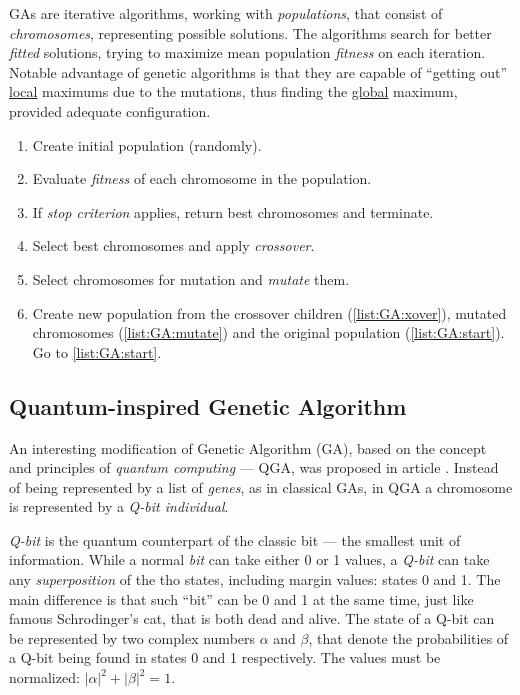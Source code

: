 \documentclass[ThesisDoc]{subfiles}
\begin{document}
GAs are iterative algorithms, working with \emph{populations}, that consist of
\emph{chromosomes}, representing possible solutions. The algorithms search
for better \emph{fitted} solutions, trying to maximize mean population
\emph{fitness} on each iteration.
Notable advantage of genetic algorithms is that they are capable of
``getting out'' \underline{local} maximums due to the mutations, thus finding
the \underline{global} maximum, provided adequate configuration.

\begin{enumerate}[start=0]
  \item Create initial population (randomly).
  \item\label{list:GA:start} Evaluate \emph{fitness} of each chromosome in the population.
  \item If \emph{stop criterion} applies, return best chromosomes and terminate.
  \item\label{list:GA:xover} Select best chromosomes and apply \emph{crossover}.
  \item\label{list:GA:mutate} Select chromosomes for mutation and \emph{mutate} them.
  \item Create new population from the crossover children (\ref{list:GA:xover}),
        mutated chromosomes (\ref{list:GA:mutate}) and the original population
        (\ref{list:GA:start}).
        Go to \ref{list:GA:start}.
\end{enumerate}

\subsection{Quantum-inspired Genetic Algorithm}
An interesting modification of Genetic Algorithm (GA), based on the concept and
principles of \emph{quantum computing} --- QGA, was proposed in article
\cite{QuantumGeneticAlgorithm}.
Instead of being represented by a list of \emph{genes}, as in classical GAs,
in QGA a chromosome is represented by a \emph{Q-bit individual}.

\emph{Q-bit} is the quantum counterpart of the classic bit --- the smallest
unit of information. While a normal \emph{bit} can take either 0 or 1 values,
a \emph{Q-bit} can take any \emph{superposition} of the tho states, including
margin values: states 0 and 1. The main difference is that such ``bit'' can be
0 and 1 at the same time, just like famous Schrodinger's cat, that is both dead
and alive. The state of a Q-bit can be represented by two complex numbers
$\alpha$ and $\beta$, that denote the probabilities of a Q-bit being found in
states 0 and 1 respectively.
The values must be normalized: $|\alpha|^2 + |\beta|^2 = 1$.
\end{document}

